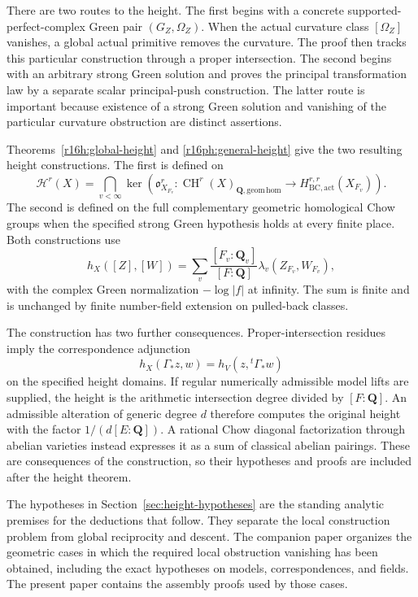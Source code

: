 \documentclass[11pt,a4paper]{article}
\theoremstyle{definition}
\theoremstyle{remark}
\numberwithin{equation}{section}
\newcommand{\CH}{\operatorname{CH}}
\begin{document}
There are two routes to the height. The first begins with a concrete supported-perfect-complex Green pair $(G_Z,\Omega_Z)$. When the actual curvature class $[\Omega_Z]$ vanishes, a global actual primitive removes the curvature. The proof then tracks this particular construction through a proper intersection. The second begins with an arbitrary strong Green solution and proves the principal transformation law by a separate scalar principal-push construction. The latter route is important because existence of a strong Green solution and vanishing of the particular curvature obstruction are distinct assertions.

Theorems~\ref{r16h:global-height} and \ref{r16ph:general-height} give the two resulting height constructions. The first is defined on
\[
 \mathcal H^r(X)=\bigcap_{v<\infty}
 \ker\!\left(\mathfrak o_{X_{F_v}}^r:
 \CH^r(X)_{\mathbf Q,\mathrm{geom\,hom}}
 \longrightarrow H_{\mathrm{BC,act}}^{r,r}(X_{F_v})\right).
\]
The second is defined on the full complementary geometric homological Chow groups when the specified strong Green hypothesis holds at every finite place. Both constructions use
\[
 h_X([Z],[W])=\sum_v\frac{[F_v:\mathbf Q_v]}{[F:\mathbf Q]}
                    \lambda_v(Z_{F_v},W_{F_v}),
\]
with the complex Green normalization $-\log|f|$ at infinity. The sum is finite and is unchanged by finite number-field extension on pulled-back classes.

The construction has two further consequences. Proper-intersection residues imply the correspondence adjunction
\[
 h_X(\Gamma_*z,w)=h_V(z,{}^t\Gamma_*w)
\]
on the specified height domains. If regular numerically admissible model lifts are supplied, the height is the arithmetic intersection degree divided by $[F:\mathbf Q]$. An admissible alteration of generic degree $d$ therefore computes the original height with the factor $1/(d[E:\mathbf Q])$. A rational Chow diagonal factorization through abelian varieties instead expresses it as a sum of classical abelian pairings. These are consequences of the construction, so their hypotheses and proofs are included after the height theorem.

The hypotheses in Section~\ref{sec:height-hypotheses} are the standing analytic premises for the deductions that follow. They separate the local construction problem from global reciprocity and descent. The companion paper \cite{SC} organizes the geometric cases in which the required local obstruction vanishing has been obtained, including the exact hypotheses on models, correspondences, and fields. The present paper contains the assembly proofs used by those cases.
\end{document}
